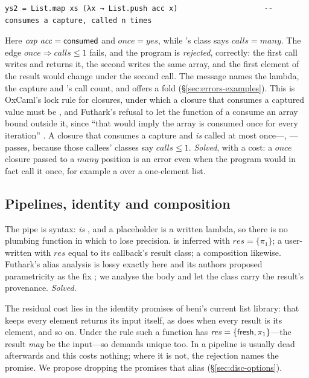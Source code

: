 \begin{Verbatim}
ys2 = List.map xs (λx → List.push acc x)                    -- consumes a capture, called n times
\end{Verbatim}
Here $\mathit{cap}\ \mathit{acc} = \mathsf{consumed}$ and $\mathit{once} = \mathit{yes}$, while 's
class says $\mathit{calls} = \mathit{many}$. The edge $\mathit{once} \Rightarrow \mathit{calls} \le 1$
fails, and the program is \emph{rejected}, correctly: the first call writes  and returns it,
the second writes the same array, and the first element of the result would change under the second
call. The message names the lambda, the capture and 's call count, and offers a fold
(\S\ref{sec:errors-examples}). This is OxCaml's lock rule for closures, under which a closure that
consumes a captured value must be  \citep[\S3.3]{lorenzen2024oxidizing}, and Futhark's
refusal to let the function of a  consume an array bound outside it, since ``that would
imply the array is consumed once for every iteration'' \citep[\S3.3]{henriksen2017futhark}. A closure
that consumes a capture and \emph{is} called at most once---, ---passes, because those callees' classes say
$\mathit{calls} \le 1$. \emph{Solved}, with a cost: a $\mathit{once}$ closure passed to a
$\mathit{many}$ position is an error even when the program would in fact call it once, for example a
 over a one-element list.

\subsection{Pipelines, identity and composition}
\label{sec:hard-pipelines}

The pipe is syntax:  \emph{is}
, and a placeholder is a written lambda, so there is no plumbing
function in which to lose precision.  is inferred with $\mathit{res} = \{\pi_1\}$;
a user-written  with $\mathit{res}$ equal to its callback's result class; a
composition  likewise. Futhark's alias analysis is lossy exactly here and its
authors proposed parametricity as the fix \citep{henriksen2026aliasing}; we analyse the body and let
the class carry the result's provenance. \emph{Solved.}

The residual cost lies in the identity promises of beni's current list library:  that
keeps every element returns its input itself, as does  when every result is \code{===} its
element, and so on. Under the rule such a function has $\mathit{res} = \{\mathsf{fresh}, \pi_1\}$---the result
\emph{may} be the input---so  demands  unique too. In a
pipeline  is usually dead afterwards and this costs nothing; where it is not, the rejection
names the promise. We propose dropping the promises that alias (\S\ref{sec:disc-options}).


